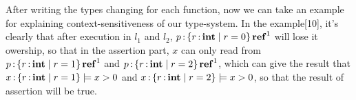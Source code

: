 \documentclass[runningheads]{llncs}
\begin{document}
\begin{parcolumns}{2}
\colplacechunks
\end{parcolumns}

\begin{parcolumns}{2}
\colplacechunks
\end{parcolumns}

After writing the types changing for each function, now we can take an example for explaining context-sensitiveness of our type-system.
In the example[10], it's clearly that after execution in $l_1$ and $l_2$, $p \operatorname{:} \left\{{r \operatorname{:} \mathbf{int} \mid r = 0}\right\} \operatorname{\mathbf{ref}}^1$ will lose it owership,
so that in the assertion part, $x$ can only read from $p \operatorname{:} \left\{{r \operatorname{:} \mathbf{int} \mid r = 1}\right\} \operatorname{\mathbf{ref}}^1$ and $p \operatorname{:} \left\{{r \operatorname{:} \mathbf{int} \mid r = 2}\right\} \operatorname{\mathbf{ref}}^1$,
which can give the result that $x \operatorname{:} \left\{{r \operatorname{:} \mathbf{int} \mid r = 1}\right\} \models x>0$ and $x \operatorname{:} \left\{{r \operatorname{:} \mathbf{int} \mid r = 2}\right\} \models x>0$, so that
the result of assertion will be true.
\end{document}
